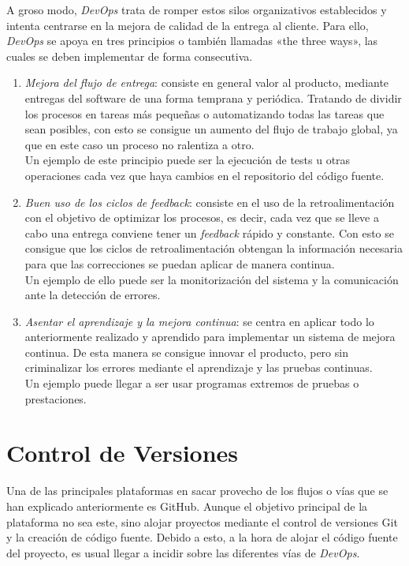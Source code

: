 A groso modo, \textit{DevOps} trata de romper estos silos organizativos establecidos y intenta centrarse en la mejora de calidad de la entrega al cliente. Para ello, \textit{DevOps} se apoya en tres principios o también llamadas «the three ways», las cuales se deben implementar de forma consecutiva. \cite{ilimit-devops}

\begin{enumerate}
    \item\textit{Mejora del flujo de entrega}: consiste en general valor al producto, mediante entregas del software de una forma temprana y periódica. Tratando de dividir los procesos en tareas más pequeñas o automatizando todas las tareas que sean posibles, con esto se consigue un aumento del flujo de trabajo global, ya que en este caso un proceso no ralentiza a otro. \\
    Un ejemplo de este principio puede ser la ejecución de tests u otras operaciones cada vez que haya cambios en el repositorio del código fuente.
    \item\textit{Buen uso de los ciclos de feedback}: consiste en el uso de la retroalimentación con el objetivo de optimizar los procesos, es decir, cada vez que se lleve a cabo una entrega conviene tener un \textit{feedback} rápido y constante. Con esto se consigue que los ciclos de retroalimentación obtengan la información necesaria para que las correcciones se puedan aplicar de manera continua. \\
    Un ejemplo de ello puede ser la monitorización del sistema y la comunicación ante la detección de errores.
    \item\textit{Asentar el aprendizaje y la mejora continua}: se centra en aplicar todo lo anteriormente realizado y aprendido para implementar un sistema de mejora continua. De esta manera se consigue innovar el producto, pero sin criminalizar los errores mediante el aprendizaje y las pruebas continuas. \\
    Un ejemplo puede llegar a ser usar programas extremos de pruebas o prestaciones.
\end{enumerate}

\section{Control de Versiones}
Una de las principales plataformas en sacar provecho de los flujos o vías que se han explicado anteriormente es GitHub. Aunque el objetivo principal de la plataforma no sea este, sino alojar proyectos mediante el control de versiones Git y la creación de código fuente. Debido a esto, a la hora de alojar el código fuente del proyecto, es usual llegar a incidir sobre las diferentes vías de \textit{DevOps}. \cite{github-manual}

